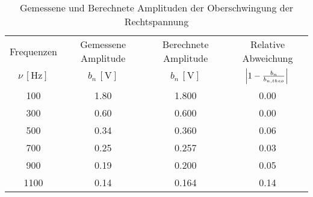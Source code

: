 \begin{table}[!h]
	\centering
	\begin{tabular}{|c|c|c|c|}
		\hline
		Frequenzen & Gemessene Amplitude & Berechnete Amplitude & Relative Abweichung\\
		$\nu\,[\si{\hertz}]$ & $b_{n}\,[\si{\volt}]$ & $b_{n}\,[\si{\volt}]$ & $\envert{1 - \tfrac{b_{n}}{b_{n,theo}}}$\\\hline\hline
		\num{100}  & \num{1.80}  & \num{1.800}  & \num{0.00} \\
		\num{300}  & \num{0.60}  & \num{0.600}  & \num{0.00} \\
		\num{500}  & \num{0.34}  & \num{0.360}  & \num{0.06} \\
		\num{700}  & \num{0.25}  & \num{0.257}  & \num{0.03} \\
		\num{900}  & \num{0.19}  & \num{0.200}  & \num{0.05} \\
		\num{1100}  & \num{0.14}  & \num{0.164}  & \num{0.14} \\
		\hline
	\end{tabular}
	\caption{Gemessene und Berechnete Amplituden der Oberschwingung der Rechtspannung \label{tab:Analyse1}}
\end{table}